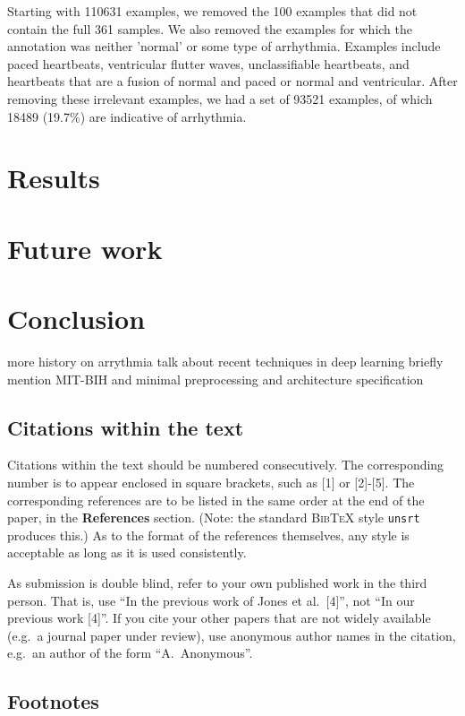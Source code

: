 \documentclass{article} %
\begin{document}
Starting with 110631 examples, we removed the 100 examples that did not contain the full 361 samples. We also removed the examples for which the annotation was neither 'normal' or some type of arrhythmia. Examples include paced heartbeats, ventricular flutter waves, unclassifiable heartbeats, and heartbeats that are a fusion of normal and paced or normal and ventricular. After removing these irrelevant examples, we had a set of 93521 examples, of which 18489 (19.7\%) are indicative of arrhythmia.


\section{Results}

\section{Future work}

\section{Conclusion}

more history on arrythmia
talk about recent techniques in deep learning
briefly mention MIT-BIH and minimal preprocessing and architecture specification

\subsection{Citations within the text}

Citations within the text should be numbered consecutively. The corresponding
number is to appear enclosed in square brackets, such as [1] or [2]-[5]. The
corresponding references are to be listed in the same order at the end of the
paper, in the \textbf{References} section. (Note: the standard
\textsc{Bib\TeX} style \texttt{unsrt} produces this.) As to the format of the
references themselves, any style is acceptable as long as it is used
consistently.

As submission is double blind, refer to your own published work in the 
third person. That is, use ``In the previous work of Jones et al.\ [4]'',
not ``In our previous work [4]''. If you cite your other papers that
are not widely available (e.g.\ a journal paper under review), use
anonymous author names in the citation, e.g.\ an author of the
form ``A.\ Anonymous''. 


\subsection{Footnotes}
\end{document}
